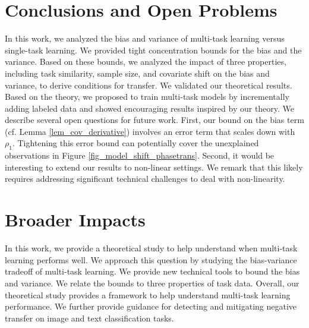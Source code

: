\vspace{-0.05in}
\section{Conclusions and Open Problems}
\vspace{-0.05in}

In this work, we analyzed the bias and variance of multi-task learning versus single-task learning.
We provided tight concentration bounds for the bias and the variance.
Based on these bounds, we analyzed the impact of three properties, including task similarity, sample size, and covariate shift on the bias and variance, to derive conditions for transfer.
We validated our theoretical results.
Based on the theory, we proposed to train multi-task models by incrementally adding labeled data and showed encouraging results inspired by our theory.
We describe several open questions for future work.
First, our bound on the bias term (cf. Lemma \ref{lem_cov_derivative}) involves an error term that scales down with $\rho_1$.
Tightening this error bound can potentially cover the unexplained observations in Figure \ref{fig_model_shift_phasetrans}.
Second, it would be interesting to extend our results to non-linear settings.
We remark that this likely requires addressing significant technical challenges  to deal with non-linearity.

\newpage
\section*{Broader Impacts}

In this work, we provide a theoretical study to help understand when multi-task learning performs well.
We approach this question by studying the bias-variance tradeoff of multi-task learning.
We provide new technical tools to bound the bias and variance.
We relate the bounds to three properties of task data.
Overall, our theoretical study provides a framework to help understand multi-task learning performance.
We further provide guidance for detecting and mitigating negative transfer on image and text classification tasks.

